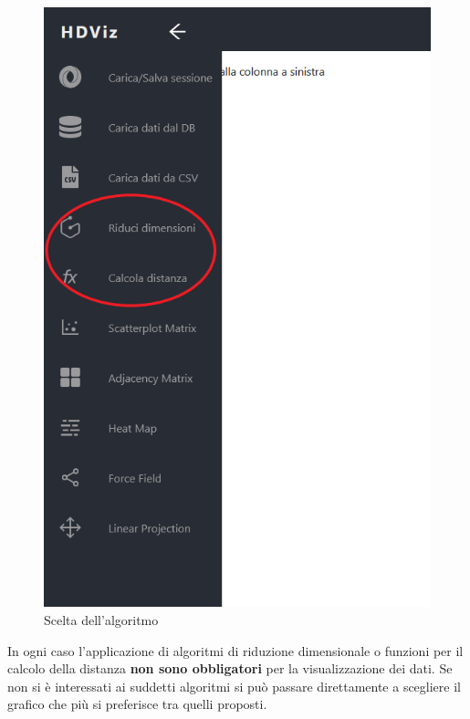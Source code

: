 \begin{figure}[H]
		\includegraphics[scale=0.4]{Images/SceltaAlgoritmi.png}
		\centering
		\caption{Scelta dell'algoritmo}
\end{figure}

In ogni caso l'applicazione di algoritmi di riduzione dimensionale o funzioni per il calcolo della distanza \textbf{non sono obbligatori} per la visualizzazione dei dati. Se non si è interessati ai suddetti algoritmi si può passare direttamente a scegliere il grafico che più si preferisce tra quelli proposti.


